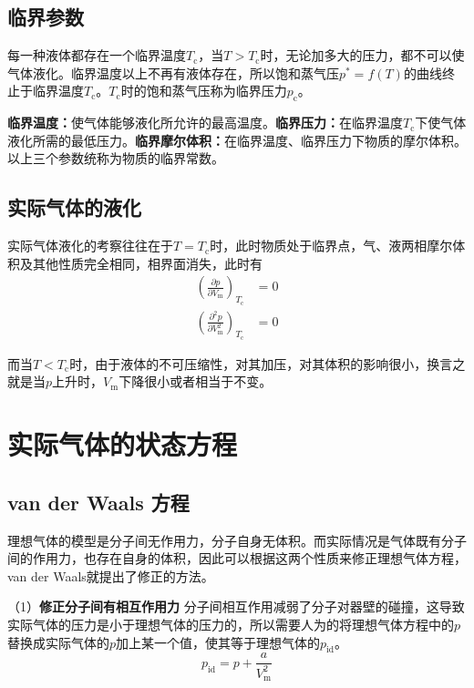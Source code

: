 \documentclass[lang=cn,newtx,10pt,scheme=chinese]{elegantbook}
\begin{document}
\subsection{临界参数}
每一种液体都存在一个临界温度$T_\mathrm{c}$，当$T>T_\mathrm{c}$时，无论加多大的压力，都不可以使气体液化。临界温度以上不再有液体存在，所以饱和蒸气压$p^*=f(T)$的曲线终止于临界温度$T_\mathrm{c}$。$T_\mathrm{c}$时的饱和蒸气压称为临界压力$p_\mathrm{c}$。

\textbf{临界温度：}使气体能够液化所允许的最高温度。\textbf{临界压力：}在临界温度$T_\mathrm{c}$下使气体液化所需的最低压力。\textbf{临界摩尔体积：}在临界温度、临界压力下物质的摩尔体积。以上三个参数统称为物质的临界常数。

\subsection{实际气体的液化}
实际气体液化的考察往往在于$T=T_\mathrm{c}$时，此时物质处于临界点，气、液两相摩尔体积及其他性质完全相同，相界面消失，此时有
\begin{equation}
	\begin{aligned}
		\left ( \frac{\partial p}{\partial V_{\mathrm{m} }}  \right )_{T_\mathrm{c} } &= 0 \\[1.5ex]
		\left ( \frac{\partial^2 p}{\partial V^2_{\mathrm{m} }}  \right )_{T_\mathrm{c} } &=0
	\end{aligned}
\end{equation}

而当$T<T_{\mathrm{c}}$时，由于液体的不可压缩性，对其加压，对其体积的影响很小，换言之就是当$p$上升时，$V_\mathrm{m}$下降很小或者相当于不变。

\section{实际气体的状态方程}
\subsection{van der Waals 方程}
理想气体的模型是分子间无作用力，分子自身无体积。而实际情况是气体既有分子间的作用力，也存在自身的体积，因此可以根据这两个性质来修正理想气体方程，van der Waals就提出了修正的方法。

（1）\textbf{修正分子间有相互作用力} \quad 分子间相互作用减弱了分子对器壁的碰撞，这导致实际气体的压力是小于理想气体的压力的，所以需要人为的将理想气体方程中的$p$替换成实际气体的$p$加上某一个值，使其等于理想气体的$p_{\mathrm{id}}$。
\begin{equation}
	p_{\mathrm{id}} = p + \frac{a}{V^2_{\mathrm{m}}}
\end{equation}
\end{document}
